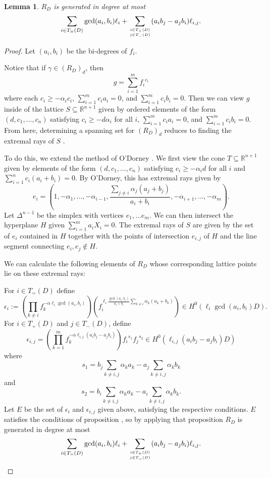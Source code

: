 \documentclass{amsart}
\theoremstyle{plain}
\newtheorem{lem}[thm]{Lemma}
\theoremstyle{definition}
\theoremstyle{remark}
\numberwithin{equation}{section}
\begin{document}
\begin{lem}
$R_D$ is generated in degree at most
\[
	\sum_{i\in T_=(D)} \gcd(a_i, b_i)\ell_i + \sum_{i\in T_+(D) \atop j\in T_-(D)} (a_i b_j- a_j b_i)\ell_{i,j}.
\]
\end{lem}
\begin{proof}
Let $(a_i, b_i)$ be the bi-degrees of $f_i$. 

Notice that if $\gamma \in (R_D)_d$, then 
\[
	g = \sum_{i=1}^m {f_i}^{c_i}
\]
where each $c_i \ge - \alpha_i c_i$, $\sum_{i=1}^m c_i a_i = 0$, and $\sum_{i=1}^m c_i b_i = 0$.  Then we can view $g$ inside of the lattice
$S\subseteq \mathbb{R}^{n+1}$ given by ordered elements of the form $(d, c_1, \ldots, c_n)$ satisfying $c_i \ge - d \alpha_i$ for all $i$, $\sum_{i=1}^m c_i a_i = 0$, and $\sum_{i=1}^m c_i b_i = 0$. 
From here, determining a spanning set for $(R_D)_d$ reduces to finding the extremal rays of $S$ .  

To do this, we extend the method of O'Dorney .  We first view the cone $T\subseteq \mathbb{R}^{n+1}$ given by elements of the form $(d, c_1, \ldots, c_n)$ satisfying $c_i \ge -\alpha_i d$ for all $i$ and $\sum_{i=1}^n c_i (a_i + b_i) =0$.  By O'Dorney, this has extremal rays given by 
\[
	e_i = (1, -\alpha_1, \ldots, -\alpha_{i-1}, \frac{\sum_{j \ne i} \alpha_j(a_j+ b_j)}{a_i + b_i}, -\alpha_{i+1}, \ldots, - \alpha_m).
\]
Let $\Delta^{n-1}$ be the simplex with vertices $e_1, \ldots e_m$.  We can then intersect the hyperplane $H$ given $\sum_{i=1}^m  a_i X_i = 0$.  The extremal rays of $S$ are given by the set of $e_i$ contained in $H$ together with the points of intersection $e_{i,j}$ of $H$ and the line segment connecting $e_i, e_j \not \in H$.

 We can calculate the following elements of $R_D$ whose corresponding lattice points lie on these extremal rays:

For $i \in T_=(D)$
define
\[
	\epsilon_i := (\prod_{k \ne i} f_k^{-\alpha \ell_i \gcd(a_i, b_i)}) (f_i^{\ell_i \frac{\gcd(a_i, b_i)}{a_i + b_i}\sum_{k \ne i} \alpha_k (a_k + b_k)}) \in H^0(\ell_i \gcd(a_i, b_i) D).
\]
For $i \in T_+(D)$ and $j \in T_-(D)$, define
\[
	\epsilon_{i, j} = (\prod_{k = 1}^m f_k^{-\alpha \ell_{i,j} (a_i b_j - a_j b_i)}) {f_i}^{s_1} {f_j}^{s_2} \in H^0(\ell_{i,j}(a_i b_j - a_j b_i)D)
\]
where
\[
	s_1 = b_j \sum_{k \ne i,j} \alpha_k a_k - a_j \sum_{k\ne i, j} \alpha_k b_k
\]
and
\[
	s_2 = b_i \sum_{k \ne i,j} \alpha_k a_k - a_i \sum_{k \ne i, j} \alpha_k b_k.
\]
Let $E$ be the set of $\epsilon_i$ and $\epsilon_{i,j}$ given above, satisfying the respective conditions.
$E$ satisfies the conditions of proposition , so by applying that proposition $R_D$ is generated in degree at most
\[
	\sum_{i\in T_=(D)} \gcd(a_i, b_i)\ell_i + \sum_{i\in T_+(D) \atop j\in T_-(D)} (a_i b_j- a_j b_i)\ell_{i,j}.
\]
\end{proof}
\end{document}
